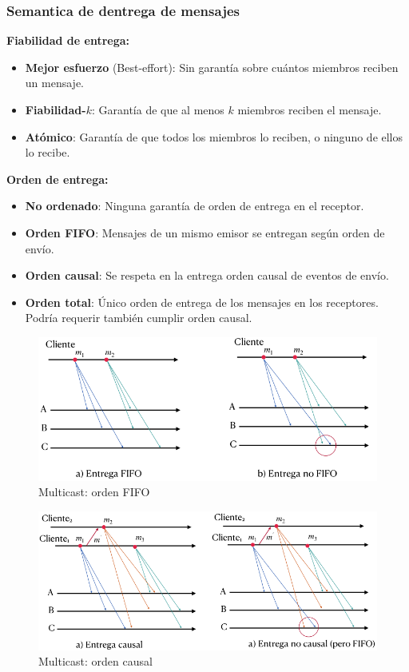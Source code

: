 \subsubsection{Semantica de dentrega de mensajes}
\textbf{Fiabilidad de entrega:}
\begin{itemize}
    \item \textbf{Mejor esfuerzo} (Best-effort): Sin garantía sobre cuántos miembros reciben un mensaje.
    \item \textbf{Fiabilidad-}$k$: Garantía de que al menos $k$ miembros reciben el mensaje.
    \item \textbf{Atómico}: Garantía de que todos los miembros lo reciben, o ninguno de ellos lo recibe.
\end{itemize}
\textbf{Orden de entrega:}
\begin{itemize}
    \item \textbf{No ordenado}: Ninguna garantía de orden de entrega en el receptor.
    \item \textbf{Orden FIFO}: Mensajes de un mismo emisor se entregan según orden de envío.
    \item \textbf{Orden causal}: Se respeta en la entrega orden causal de eventos de envío.
    \item \textbf{Orden total}: Único orden de entrega de los mensajes en los receptores. Podría requerir también cumplir orden causal.
\end{itemize}

\begin{figure}[H]
    \centering
    \includegraphics[width=0.7\linewidth]{img/multi_fifo.png}
    \caption{Multicast: orden FIFO}\label{fig:1761678535409}
\end{figure}

\begin{figure}[H]
    \centering
    \includegraphics[width=0.7\linewidth]{img/multi_causal.png}
    \caption{Multicast: orden causal}\label{fig:1761678585653}
\end{figure}

